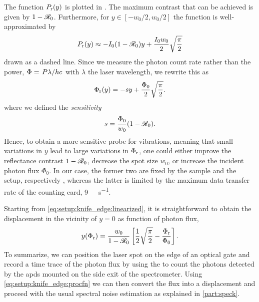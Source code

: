 The function $P_{\mathrm{r}}(y)$ is plotted in .
The maximum contrast that can be achieved is given by $1-\mathscr{R}_0$.
Furthermore, for $y\in[-w_0/2, w_0/2]$ the function is well-approximated by
\begin{equation}\label{eq:setup:knife_edge:approx}
    P_{\mathrm{r}}(y)\approx -I_0(1-\mathscr{R}_0)y + \frac{I_0 w_0}{2}\sqrt{\frac{\pi}{2}}
\end{equation}
drawn as a dashed line.
Since we measure the photon count rate rather than the power, $\Phi = \flatfrac{P\lambda}{hc}$ with $\lambda$ the laser wavelength, we rewrite this as
\begin{equation}\label{eq:setup:knife_edge:linearized}
    \Phi_{\mathrm{r}}(y) = -sy + \frac{\Phi_0}{2}\sqrt{\frac{\pi}{2}}.
\end{equation}
where we defined the \emph{sensitivity}
\begin{equation}\label{eq:setup:knife_edge:sensitivity}
    s = \frac{\Phi_0}{w_0}(1 - \mathscr{R}_0).
\end{equation}
Hence, to obtain a more sensitive probe for vibrations, meaning that small variations in $y$ lead to large variations in $\Phi_{\mathrm{r}}$, one could either improve the reflectance contrast $1-\mathscr{R}_0$, decrease the spot size $w_0$, or increase the incident photon flux $\Phi_0$.
In our case, the former two are fixed by the sample and the setup, respectively , whereas the latter is limited by the maximum data transfer rate of the \tagger counting card, \qty{9}{\mega\sample\per\second}.

Starting from \cref{eq:setup:knife_edge:linearized}, it is straightforward to obtain the displacement in the vicinity of $y=0$ as function of photon flux,
\begin{equation}\label{eq:setup:knife_edge:procfn}
     y(\Phi_{\mathrm{r}}) = \frac{w_0}{1-\mathscr{R}_0}\left[\frac{1}{2}\sqrt{\frac{\pi}{2}} - \frac{\Phi_{\mathrm{r}}}{\Phi_0}\right].
\end{equation}
To summarize, we can position the laser spot on the edge of an optical gate and record a time trace of the photon flux by using the \taggershort to count the photons detected by the \glspl{apd} mounted on the side exit of the spectrometer.
Using \cref{eq:setup:knife_edge:procfn} we can then convert the flux into a displacement and proceed with the usual spectral noise estimation as explained in \cref{part:speck}.

